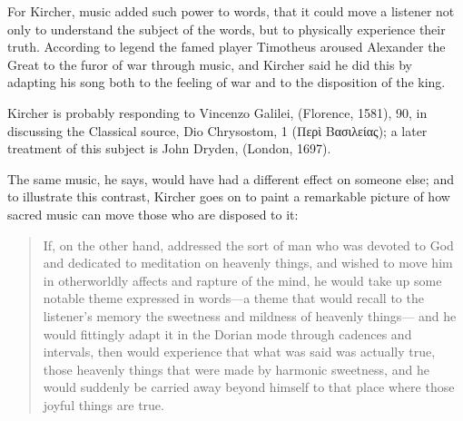 For Kircher, music added such power to words, that it could move a listener not 
only to understand the subject of the words, but to physically experience their 
truth.
According to legend the famed  player Timotheus aroused Alexander 
the Great to the furor of war through music, and Kircher said he did this by 
adapting his song both to the feeling of war and to the disposition of the 
king.%
    \begin{Footnote}
        Kircher is probably responding to Vincenzo Galilei,  (Florence, 1581), 90, in discussing the Classical source, Dio 
        Chrysostom,  1 (\textgreek{Περὶ Βασιλείας});  a later 
        treatment of this subject is John Dryden,  (London, 1697).
    \end{Footnote}
The same music, he says, would have had a different effect on someone else; and 
to illustrate this contrast, Kircher goes on to paint a remarkable picture of 
how sacred music can move those who are disposed to it:
\begin{quote}
    If, on the other hand,  addressed the sort of man who was 
    devoted to God and dedicated to meditation on heavenly things,
    and wished to move him in otherworldly affects and rapture of the mind,
    he would take up some notable theme expressed in words---a theme that would 
    recall to the listener's memory the sweetness and mildness of heavenly things---
    and he would fittingly adapt it in the Dorian mode through cadences and 
    intervals,
    then  would experience that what was said was actually 
    true,
    those heavenly things that were made by harmonic sweetness,
    and he would suddenly be carried away beyond himself to that place where 
    those joyful things are true.%
        \Autocite
        [bk.~7, 550:
        .]
        {Kircher:Musurgia}
\end{quote}

